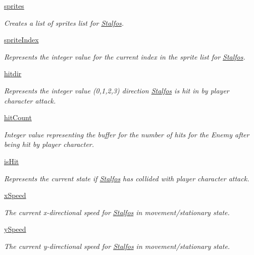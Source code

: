 \begin{DoxyCompactItemize}
\hyperlink{classactor_1_1stalfos_1_1_stalfos_ae17287c8f3a51b650b3f99cad297b3f1}{sprites}
\begin{DoxyCompactList}\small\item\em Creates a list of sprites list for \hyperlink{classactor_1_1stalfos_1_1_stalfos}{Stalfos}. \end{DoxyCompactList}\item 
\hyperlink{classactor_1_1stalfos_1_1_stalfos_a9036a53b8457cda5d4955ad65dde6ae0}{sprite\+Index}
\begin{DoxyCompactList}\small\item\em Represents the integer value for the current index in the sprite list for \hyperlink{classactor_1_1stalfos_1_1_stalfos}{Stalfos}. \end{DoxyCompactList}\item 
\hyperlink{classactor_1_1stalfos_1_1_stalfos_acc6601a3d6ab3ff329bf2cd9f5186ef3}{hitdir}
\begin{DoxyCompactList}\small\item\em Represents the integer value (0,1,2,3) direction \hyperlink{classactor_1_1stalfos_1_1_stalfos}{Stalfos} is hit in by player character attack. \end{DoxyCompactList}\item 
\hyperlink{classactor_1_1stalfos_1_1_stalfos_aaebbd89b15752a9cca8e144dd6645b7b}{hit\+Count}
\begin{DoxyCompactList}\small\item\em Integer value representing the buffer for the number of hits for the Enemy after being hit by player character. \end{DoxyCompactList}\item 
\hyperlink{classactor_1_1stalfos_1_1_stalfos_a60385857eaf3f3b7aacc4bec982223eb}{is\+Hit}
\begin{DoxyCompactList}\small\item\em Represents the current state if \hyperlink{classactor_1_1stalfos_1_1_stalfos}{Stalfos} has collided with player character attack. \end{DoxyCompactList}\item 
\hyperlink{classactor_1_1stalfos_1_1_stalfos_a43a40d9338696f2c75c883b13a13ea45}{x\+Speed}
\begin{DoxyCompactList}\small\item\em The current x-\/directional speed for \hyperlink{classactor_1_1stalfos_1_1_stalfos}{Stalfos} in movement/stationary state. \end{DoxyCompactList}\item 
\hyperlink{classactor_1_1stalfos_1_1_stalfos_ab71f0423b0af31ef9f60230eda08ff91}{y\+Speed}
\begin{DoxyCompactList}\small\item\em The current y-\/directional speed for \hyperlink{classactor_1_1stalfos_1_1_stalfos}{Stalfos} in movement/stationary state. \end{DoxyCompactList}\end{DoxyCompactItemize}


